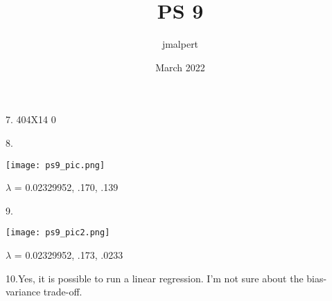 \documentclass{article}
\title{PS 9}
\author{jmalpert }
\date{March 2022}
\begin{document}
\maketitle


7. 
\vspace{2mm}
404X14
0

\vspace{2mm}

8. 

\texttt{[image: ps9\_pic.png]}

$\lambda$ = 0.02329952, .170, .139 


\vspace{2mm}

9.

\vspace{2mm}

\texttt{[image: ps9\_pic2.png]}

$\lambda$ = 0.02329952, .173, .0233


\vspace{2mm}

10.Yes, it is possible to run a linear regression.  I'm not sure about the bias-variance trade-off. 
\end{document}
